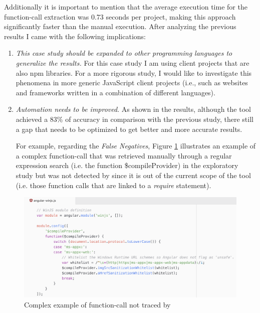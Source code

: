 Additionally it is important to mention that the average execution time for the function-call extraction was 0.73 seconds per project, making this approach significantly faster than the manual execution.
\vspace{5mm}
After analyzing the previous results I came with the following implications:
\begin{enumerate}
    \item \textit{This case study should be expanded to other programming languages to generalize the results.}
    For this case study I am using client projects that are also npm libraries. 
    For a more rigorous study, I would like to investigate this phenomena in more generic JavaScript client projects (i.e., such as websites and frameworks written in a combination of different languages).
    \item \textit{Automation needs to be improved}. As shown in the results, although the tool achieved a 83\% of accuracy in comparison with the previous study, there still a gap that needs to be optimized to get better and more accurate results.
    
    For example, regarding the \textit{False Negatives}, Figure \ref{fig:falseNegativeExample} illustrates an example of a complex function-call that was retrieved manually through a regular expression search (i.e. the function \$compileProvider) in the exploratory study but was not detected by \tool[] since it is out of the current scope of the tool (i.e. those function calls that are linked to a \textit{require} statement).
\end{enumerate}

\begin{figure}[ht]
\centering
\includegraphics[width=1\textwidth]{images/false_negatives_reason.png}
\caption{Complex example of function-call not traced by \tool[]}
\label{fig:falseNegativeExample}
\end{figure}
